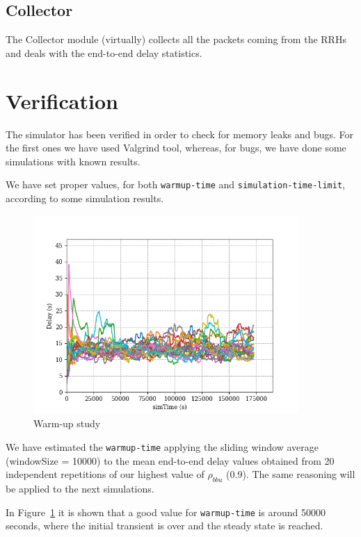 \documentclass[11pt,a4paper,oneside, openright]{article}
\begin{document}
\subsection{Collector}
The Collector module (virtually) collects all the packets coming from the RRHs and deals with the end-to-end delay statistics.



\section{Verification}
The simulator has been verified in order to check for memory leaks and bugs.
For the first ones we have used Valgrind tool, whereas, for bugs, we have done some simulations with known results.

We have set proper values, for both \texttt{warmup-time} and \texttt{simulation-time-limit}, according to some simulation results.
\begin{figure}[h]
	\centering
	\includegraphics[width=0.9\textwidth]{images/warm-up}
	\caption{Warm-up study}
	\label{fig:warm-up-study}
\end{figure}

We have estimated the \texttt{warmup-time} applying the sliding window average (windowSize = 10000) to the mean end-to-end delay values obtained from 20 independent repetitions of our highest value of $ \rho_{bbu} $ (0.9). The same reasoning will be applied to the next simulations.

In Figure~\ref{fig:warm-up-study} it is shown that a good value for \texttt{warmup-time} is around 50000 seconds, where the initial transient is over and the steady state is reached. 
\end{document}
